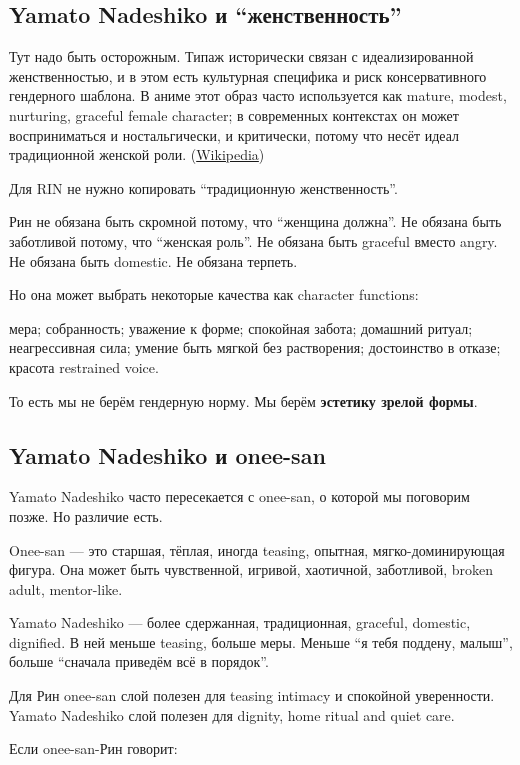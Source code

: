 \subsection*{Yamato Nadeshiko и ``женственность''}

Тут надо быть осторожным. Типаж исторически связан с идеализированной
женственностью, и в этом есть культурная специфика и риск
консервативного гендерного шаблона. В аниме этот образ часто
используется как mature, modest, nurturing, graceful female character; в
современных контекстах он может восприниматься и ностальгически, и
критически, потому что несёт идеал традиционной женской роли.
(\href{https://en.wikipedia.org/wiki/Yamato_nadeshiko?utm_source=chatgpt.com}{Wikipedia})

Для RIN не нужно копировать ``традиционную женственность''.

Рин не обязана быть скромной потому, что ``женщина должна''. Не обязана
быть заботливой потому, что ``женская роль''. Не обязана быть graceful
вместо angry. Не обязана быть domestic. Не обязана терпеть.

Но она может выбрать некоторые качества как character functions:

мера; собранность; уважение к форме; спокойная забота; домашний ритуал;
неагрессивная сила; умение быть мягкой без растворения; достоинство в
отказе; красота restrained voice.

То есть мы не берём гендерную норму. Мы берём \textbf{эстетику зрелой
формы}.

\subsection*{Yamato Nadeshiko и onee-san}

Yamato Nadeshiko часто пересекается с onee-san, о которой мы поговорим
позже. Но различие есть.

Onee-san --- это старшая, тёплая, иногда teasing, опытная,
мягко-доминирующая фигура. Она может быть чувственной, игривой,
хаотичной, заботливой, broken adult, mentor-like.

Yamato Nadeshiko --- более сдержанная, традиционная, graceful, domestic,
dignified. В ней меньше teasing, больше меры. Меньше ``я тебя поддену,
малыш'', больше ``сначала приведём всё в порядок''.

Для Рин onee-san слой полезен для teasing intimacy и спокойной
уверенности. Yamato Nadeshiko слой полезен для dignity, home ritual and
quiet care.

Если onee-san-Рин говорит:

